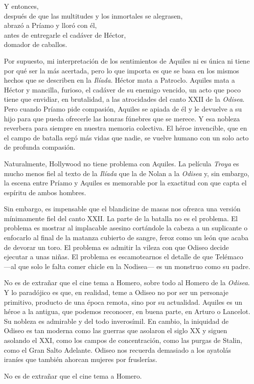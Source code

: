 \begin{versopropio}
Y entonces,\\
después de que las multitudes y los inmortales se alegrasen,\\
abrazó a Príamo y lloró con él,\\
antes de entregarle el cadáver de Héctor,\\
domador de caballos.
\end{versopropio}

Por supuesto, mi interpretación de los sentimientos de Aquiles ni es única ni tiene por qué ser la más acertada, pero lo que importa es que se basa en los mismos hechos que se describen en la \emph{Ilíada}. Héctor mata a Patroclo. Aquiles mata a Héctor y mancilla, furioso, el cadáver de su enemigo vencido, un acto que poco tiene que envidiar, en brutalidad, a las atrocidades del canto XXII de la \emph{Odisea}. Pero cuando Príamo pide compasión, Aquiles se apiada de él y le devuelve a su hijo para que pueda ofrecerle las honras fúnebres que se merece. Y esa nobleza reverbera para siempre en nuestra memoria colectiva. El héroe invencible, que en el campo de batalla segó más vidas que nadie, se vuelve humano con un solo acto de profunda compasión.

Naturalmente, Hollywood no tiene problema con Aquiles. La película \emph{Troya} es mucho menos fiel al texto de la \emph{Ilíada} que la de Nolan a la \emph{Odisea} y, sin embargo, la escena entre Príamo y Aquiles es memorable por la exactitud con que capta el espíritu de ambos hombres.

Sin embargo, es impensable que el blandicine de masas nos ofrezca una versión mínimamente fiel del canto XXII. La parte de la batalla no es el problema. El problema es mostrar al implacable asesino cortándole la cabeza a un suplicante o enfocarlo al final de la matanza cubierto de sangre, feroz como un león que acaba de devorar un toro. El problema es admitir la vileza con que Odiseo decide ejecutar a unas niñas. El problema es escamotearnos el detalle de que Telémaco ---al que solo le falta comer chicle en la Nodisea--- es un monstruo como su padre.

No es de extrañar que el cine tema a Homero, sobre todo al Homero de la \emph{Odisea}. Y lo paradójico es que, en realidad, teme a Odiseo no por ser un personaje primitivo, producto de una época remota, sino por su actualidad. Aquiles es un héroe a la antigua, que podemos reconocer, en buena parte, en Arturo o Lancelot. Su nobleza es admirable y del todo inverosímil. En cambio, la iniquidad de Odiseo es tan moderna como las guerras que asolaron el siglo XX y siguen asolando el XXI, como los campos de concentración, como las purgas de Stalin, como el Gran Salto Adelante. Odiseo nos recuerda demasiado a los ayatolás iraníes que también ahorcan mujeres por fruslerías.

No es de extrañar que el cine tema a Homero.

